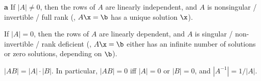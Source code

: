 \begin{property}\hskip-0.065in {\bf a} If $|A|\ne 0$, then the rows of
$A$ are linearly independent, and $A$ is nonsingular / invertible /
full rank (\ie, $A\x=\b$ has a unique solution $\x$).

  If $|A| = 0$, then the rows of $A$ are
linearly dependent, and $A$ is singular / non-invertible / rank
deficient (\ie, $A\x=\b$ either has an infinite number of solutions or
zero solutions, depending on $\b$).
\end{property} 

\begin{property} $|AB|=|A|\cdot |B|$.  In particular, $|AB|=0$
iff $|A|=0$ or $|B|=0$, and $|A^{-1}|=1/|A|$.
\end{property}
\clearpage

\def\AsupH{A^H}
\def\xsubA{\x_{\scriptscriptstyle \Rss}}
\def\AsupP{A^+}
\def\AsupI{A\protect^{-1}}


